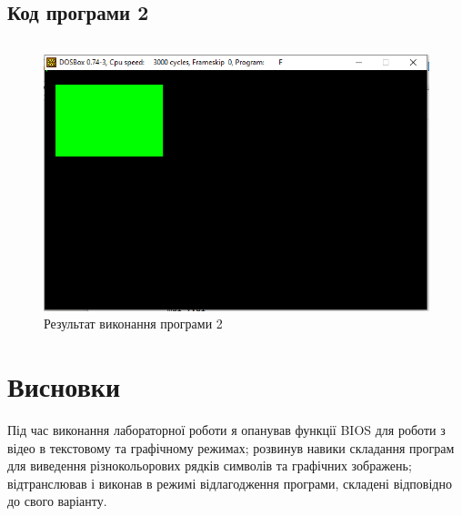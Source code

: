 \documentclass{article}
\begin{document}
\begin{normalsize}
		\subsection*{Код програми 2}
\begin{lstlisting}[language={[x86masm]Assembler}]

\end{lstlisting}

\begin{figure}[H]
	\centering
	\includegraphics[scale=0.7]{3}
	\caption{Результат виконання програми 2}
\end{figure}
		
		\section*{Висновки}
		Під час виконання лабораторної роботи я опанував функції BIOS для роботи з відео в текстовому та графічному режимах; розвинув навики складання програм для виведення різнокольорових рядків символів та графічних зображень; відтранслював і виконав в режимі відлагодження програми, складені відповідно до свого варіанту.
		
	\end{normalsize}
\end{document}

